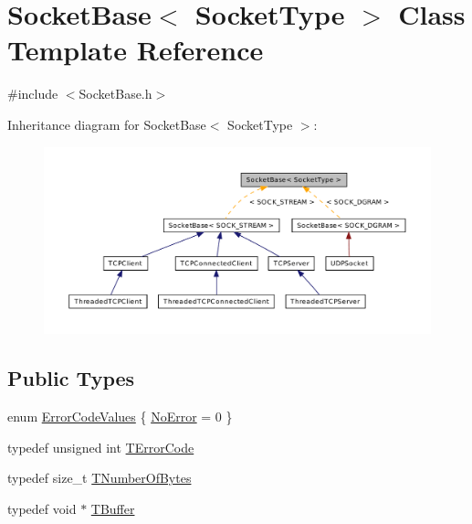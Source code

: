 \hypertarget{class_socket_base}{\section{Socket\-Base$<$ Socket\-Type $>$ Class Template Reference}
\label{class_socket_base}
}


{\ttfamily \#include $<$Socket\-Base.\-h$>$}



Inheritance diagram for Socket\-Base$<$ Socket\-Type $>$\-:\nopagebreak
\begin{figure}[H]
\begin{center}
\leavevmode
\includegraphics[width=350pt]{class_socket_base__inherit__graph}
\end{center}
\end{figure}
\subsection*{Public Types}
\begin{DoxyCompactItemize}
\item 
enum \hyperlink{class_socket_base_abb6e8769e1c9168c1ff7423fe7933d30}{Error\-Code\-Values} \{ \hyperlink{class_socket_base_abb6e8769e1c9168c1ff7423fe7933d30a01138908e891529174d30941d3014bdc}{No\-Error} = 0
 \}
\item 
typedef unsigned int \hyperlink{class_socket_base_a8feec23168739e87c6ccb7fa8c64ac11}{T\-Error\-Code}
\item 
typedef size\-\_\-t \hyperlink{class_socket_base_ac414903631491453b96e71c06c2c2e72}{T\-Number\-Of\-Bytes}
\item 
typedef void $\ast$ \hyperlink{class_socket_base_a1557d64029a25c20b4c306b80efcc143}{T\-Buffer}
\end{DoxyCompactItemize}
